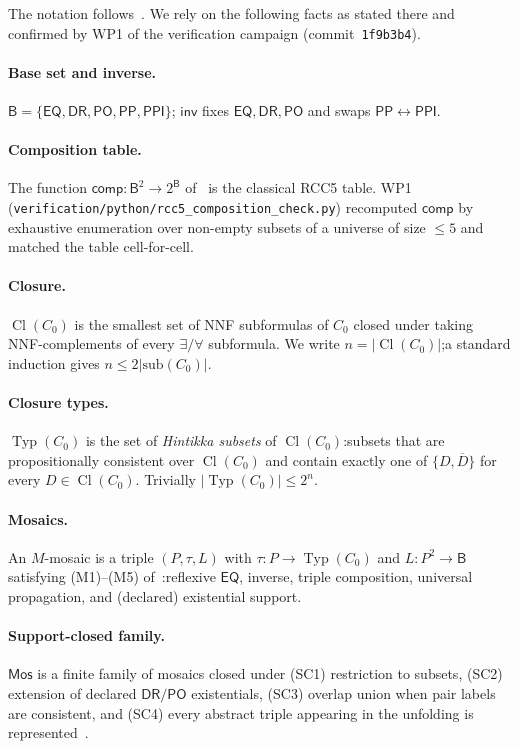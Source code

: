 \documentclass[11pt]{article}
\newcommand{\Cl}{\operatorname{Cl}}
\newcommand{\Typ}{\operatorname{Typ}}
\newcommand{\EQ}{\mathsf{EQ}}
\newcommand{\PP}{\mathsf{PP}}
\newcommand{\PPI}{\mathsf{PPI}}
\newcommand{\PO}{\mathsf{PO}}
\newcommand{\DR}{\mathsf{DR}}
\newcommand{\Base}{\mathsf{B}}
\newcommand{\Inv}{\mathsf{inv}}
\newcommand{\comp}{\mathsf{comp}}
\newcommand{\Mos}{\mathsf{Mos}}
\begin{document}
The notation follows~\cite{repaired}.  We rely on the following
facts as stated there and confirmed by WP1 of the verification
campaign (commit~\texttt{1f9b3b4}).

\paragraph{Base set and inverse.}  \(\Base = \{\EQ,\DR,\PO,\PP,\PPI\}\);
\(\Inv\) fixes \(\EQ,\DR,\PO\) and swaps \(\PP \leftrightarrow \PPI\).

\paragraph{Composition table.}  The function
\(\comp:\Base^2 \to 2^{\Base}\) of~\cite[\S3.1]{repaired} is the
classical RCC5 table.  WP1
(\texttt{verification/python/rcc5\_composition\_check.py}) recomputed
\(\comp\) by exhaustive enumeration over non-empty subsets of a
universe of size \(\le 5\) and matched the table cell-for-cell.

\paragraph{Closure.}  \(\Cl(C_0)\) is the smallest set of NNF
subformulas of \(C_0\) closed under taking NNF-complements of every
\(\exists/\forall\) subformula.  We write \(n = |\Cl(C_0)|\);\@ a
standard induction gives \(n \le 2|\mathrm{sub}(C_0)|\).

\paragraph{Closure types.}  \(\Typ(C_0)\) is the set of
\emph{Hintikka subsets} of \(\Cl(C_0)\):\@ subsets that are
propositionally consistent over \(\Cl(C_0)\) and contain exactly one
of \(\{D, \overline{D}\}\) for every \(D \in \Cl(C_0)\).  Trivially
\(|\Typ(C_0)| \le 2^n\).

\paragraph{Mosaics.}  An \(M\)-mosaic is a triple
\((P,\tau,L)\) with \(\tau:P\to\Typ(C_0)\) and
\(L:P^2 \to \Base\) satisfying (M1)--(M5)
of~\cite[Def.~4.3]{repaired}:\@ reflexive \(\EQ\), inverse, triple
composition, universal propagation, and (declared) existential
support.

\paragraph{Support-closed family.}  \(\Mos\) is a finite family of
mosaics closed under (SC1) restriction to subsets, (SC2) extension
of declared \(\DR/\PO\) existentials, (SC3) overlap union when pair
labels are consistent, and (SC4) every abstract triple appearing in
the unfolding is represented~\cite[Def.~4.4]{repaired}.
\end{document}
